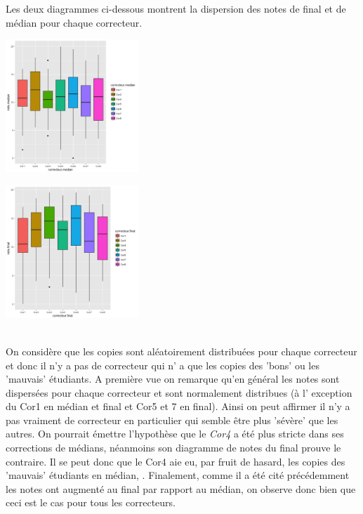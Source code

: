 \documentclass[10pt]{article}
\begin{document}
	\begin{minipage}{\linewidth}
		Les deux diagrammes ci-dessous montrent la dispersion des notes de final et de médian pour chaque correcteur.\\
		\begin{minipage}{0.50\linewidth}
			\includegraphics[width=50mm]{Figures/Notes/correcteur_median.png}
			\label{fig:scatter_correcteur_median}
		\end{minipage}
		\hspace{0.01\linewidth}
		\begin{minipage}{0.50\linewidth}	
			\includegraphics[width=50mm]{Figures/Notes/correcteur_final.png}
			\label{fig:scatter_correcteur_median}
		\end{minipage}
	\end{minipage}
\vspace{0.1mm}
\\
	On considère que les copies sont aléatoirement distribuées pour chaque correcteur et donc il n'y a pas de correcteur qui n' a que les copies des  'bons' ou les 'mauvais' étudiants. A première vue on remarque qu'en général les notes sont dispersées pour chaque correcteur et sont normalement distribues (à l' exception du Cor1 en médian et final et Cor5 et 7 en final).  Ainsi on peut affirmer il n'y a pas vraiment de correcteur en particulier qui semble être plus 'sévère' que les autres. On pourrait émettre l'hypothèse que le \textit{Cor4} a été plus stricte dans ses corrections de médians, néanmoins son diagramme de notes du final prouve le contraire. Il se peut donc que le Cor4 aie eu, par fruit de hasard,  les copies des 'mauvais' étudiants en médian, . Finalement, comme il a été cité précédemment les notes ont augmenté au final par rapport au médian, on observe donc bien que ceci est le cas pour tous les correcteurs.\\
	
\end{document}
